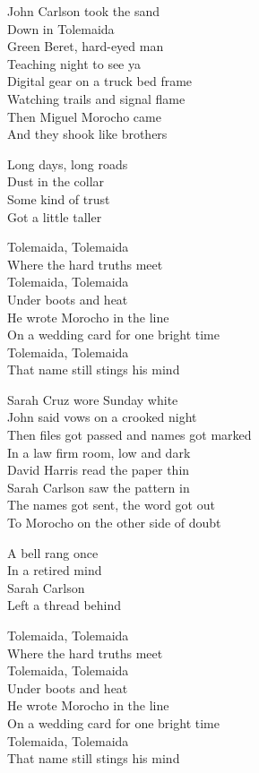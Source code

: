 \begin{lyrics}

John Carlson took the sand\\
Down in Tolemaida\\
Green Beret, hard-eyed man\\
Teaching night to see ya\\
Digital gear on a truck bed frame\\
Watching trails and signal flame\\
Then Miguel Morocho came\\
And they shook like brothers

Long days, long roads\\
Dust in the collar\\
Some kind of trust\\
Got a little taller

Tolemaida, Tolemaida\\
Where the hard truths meet\\
Tolemaida, Tolemaida\\
Under boots and heat\\
He wrote Morocho in the line\\
On a wedding card for one bright time\\
Tolemaida, Tolemaida\\
That name still stings his mind

Sarah Cruz wore Sunday white\\
John said vows on a crooked night\\
Then files got passed and names got marked\\
In a law firm room, low and dark\\
David Harris read the paper thin\\
Sarah Carlson saw the pattern in\\
The names got sent, the word got out\\
To Morocho on the other side of doubt

A bell rang once\\
In a retired mind\\
Sarah Carlson\\
Left a thread behind

Tolemaida, Tolemaida\\
Where the hard truths meet\\
Tolemaida, Tolemaida\\
Under boots and heat\\
He wrote Morocho in the line\\
On a wedding card for one bright time\\
Tolemaida, Tolemaida\\
That name still stings his mind


\end{lyrics}
